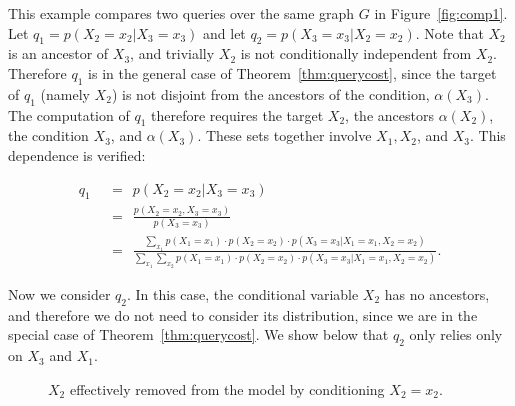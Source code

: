 \begin{example} This example compares two queries over the same graph $G$ in Figure~\ref{fig:comp1}. Let $q_{1} = p(X_{2} = x_{2}|X_{3}=x_{3})$ and let $q_{2} = p(X_{3}=x_{3}|X_{2}=x_{2})$. \newline
\null \quad \quad Note that $X_{2}$ is an ancestor of $X_{3}$, and trivially $X_{2}$ is not conditionally independent from $X_{2}$. Therefore $q_{1}$ is in the general case of Theorem~\ref{thm:querycost}, since the target of $q_{1}$ (namely $X_{2}$) is not disjoint from the ancestors of the condition, $\alpha(X_{3})$. The computation of $q_{1}$ therefore requires the target $X_{2}$, the ancestors $\alpha(X_{2})$, the condition $X_{3}$, and $\alpha(X_{3})$. These sets together involve $X_{1}, X_{2}$, and $X_{3}$. This dependence is verified:

\begin{align*}
q_{1} & \ \ = \ \ p(X_{2}=x_{2}|X_{3}=x_{3}) \\[1.2em]
& \ \ = \ \ \frac{p(X_{2}=x_{2},X_{3}=x_{3})}{p(X_{3}=x_{3})} \\[1em]
& \ \ = \ \ \frac{ \sum_{x_{1}} p(X_{1}=x_{1}) \cdot p(X_{2}=x_{2}) \cdot p(X_{3}=x_{3}|X_{1}=x_{1},X_{2}=x_{2})} { \sum_{x_{1}} \sum_{x_{2}} p(X_{1}=x_{1}) \cdot p(X_{2} = x_{2}) \cdot p(X_{3}=x_{3}|X_{1}=x_{1},X_{2}=x_{2})}.
\end{align*}

\null \quad \quad Now we consider $q_{2}$. In this case, the conditional variable $X_{2}$ has no ancestors, and therefore we do not need to consider its distribution, since we are in the special case of Theorem~\ref{thm:querycost}. We show below that $q_{2}$ only relies only on $X_{3}$ and $X_{1}$. \newline

\begin{figure}[h!]
\centering
{}
\caption{$X_{2}$ effectively removed from the model by conditioning $X_{2}=x_{2}$.}
\label{fig:comp1fade}
\end{figure}



\end{example}
